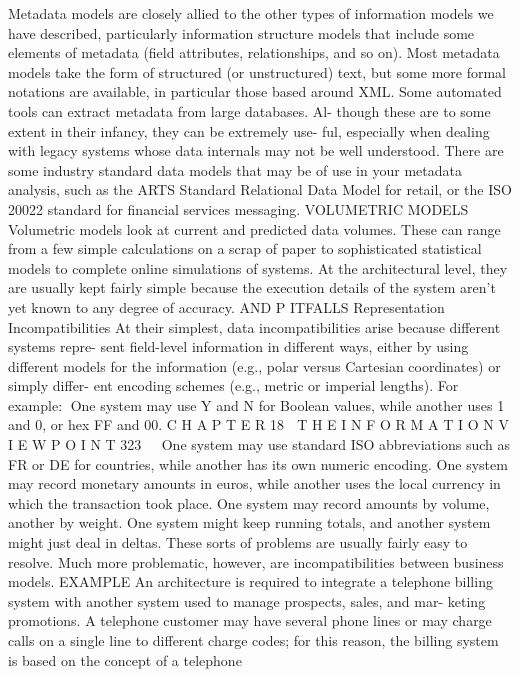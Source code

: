 Metadata models are closely allied to the other types of information
models we have described, particularly information structure models that
include some elements of metadata (field attributes, relationships, and so
on). Most metadata models take the form of structured (or unstructured)
text, but some more formal notations are available, in particular those based
around XML.
Some automated tools can extract metadata from large databases. Al-
though these are to some extent in their infancy, they can be extremely use-
ful, especially when dealing with legacy systems whose data internals may
not be well understood.
There are some industry standard data models that may be of use in your
metadata analysis, such as the ARTS Standard Relational Data Model for
retail, or the ISO 20022 standard for financial services messaging.
VOLUMETRIC MODELS Volumetric models look at current and predicted data
volumes. These can range from a few simple calculations on a scrap of paper to
sophisticated statistical models to complete online simulations of systems. At
the architectural level, they are usually kept fairly simple because the execution
details of the system aren’t yet known to any degree of accuracy.
AND P ITFALLS
Representation Incompatibilities
At their simplest, data incompatibilities arise because different systems repre-
sent field-level information in different ways, either by using different models
for the information (e.g., polar versus Cartesian coordinates) or simply differ-
ent encoding schemes (e.g., metric or imperial lengths). For example:
One system may use Y and N for Boolean values, while another uses 1
and 0, or hex FF and 00.
C H A P T E R 18  T H E I N F O R M A T I O N V I E W P O I N T
 323
One system may use standard ISO abbreviations such as FR or DE for
countries, while another has its own numeric encoding.
One system may record monetary amounts in euros, while another uses
the local currency in which the transaction took place.
One system may record amounts by volume, another by weight.
One system might keep running totals, and another system might just
deal in deltas.
These sorts of problems are usually fairly easy to resolve. Much more
problematic, however, are incompatibilities between business models.
EXAMPLE An architecture is required to integrate a telephone billing
system with another system used to manage prospects, sales, and mar-
keting promotions. A telephone customer may have several phone lines
or may charge calls on a single line to different charge codes; for this
reason, the billing system is based on the concept of a telephone
